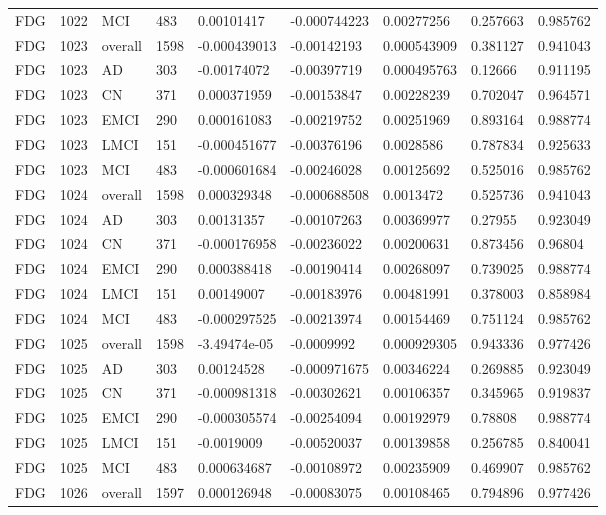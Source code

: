 \begin{landscape}
\begin{longtable}{lllllllll}
FDG & 1022 & MCI & 483 & 0.00101417 & -0.000744223 & 0.00277256 & 0.257663 & 0.985762 \\
FDG & 1023 & overall & 1598 & -0.000439013 & -0.00142193 & 0.000543909 & 0.381127 & 0.941043 \\
FDG & 1023 & AD & 303 & -0.00174072 & -0.00397719 & 0.000495763 & 0.12666 & 0.911195 \\
FDG & 1023 & CN & 371 & 0.000371959 & -0.00153847 & 0.00228239 & 0.702047 & 0.964571 \\
FDG & 1023 & EMCI & 290 & 0.000161083 & -0.00219752 & 0.00251969 & 0.893164 & 0.988774 \\
FDG & 1023 & LMCI & 151 & -0.000451677 & -0.00376196 & 0.0028586 & 0.787834 & 0.925633 \\
FDG & 1023 & MCI & 483 & -0.000601684 & -0.00246028 & 0.00125692 & 0.525016 & 0.985762 \\
FDG & 1024 & overall & 1598 & 0.000329348 & -0.000688508 & 0.0013472 & 0.525736 & 0.941043 \\
FDG & 1024 & AD & 303 & 0.00131357 & -0.00107263 & 0.00369977 & 0.27955 & 0.923049 \\
FDG & 1024 & CN & 371 & -0.000176958 & -0.00236022 & 0.00200631 & 0.873456 & 0.96804 \\
FDG & 1024 & EMCI & 290 & 0.000388418 & -0.00190414 & 0.00268097 & 0.739025 & 0.988774 \\
FDG & 1024 & LMCI & 151 & 0.00149007 & -0.00183976 & 0.00481991 & 0.378003 & 0.858984 \\
FDG & 1024 & MCI & 483 & -0.000297525 & -0.00213974 & 0.00154469 & 0.751124 & 0.985762 \\
FDG & 1025 & overall & 1598 & -3.49474e-05 & -0.0009992 & 0.000929305 & 0.943336 & 0.977426 \\
FDG & 1025 & AD & 303 & 0.00124528 & -0.000971675 & 0.00346224 & 0.269885 & 0.923049 \\
FDG & 1025 & CN & 371 & -0.000981318 & -0.00302621 & 0.00106357 & 0.345965 & 0.919837 \\
FDG & 1025 & EMCI & 290 & -0.000305574 & -0.00254094 & 0.00192979 & 0.78808 & 0.988774 \\
FDG & 1025 & LMCI & 151 & -0.0019009 & -0.00520037 & 0.00139858 & 0.256785 & 0.840041 \\
FDG & 1025 & MCI & 483 & 0.000634687 & -0.00108972 & 0.00235909 & 0.469907 & 0.985762 \\
FDG & 1026 & overall & 1597 & 0.000126948 & -0.00083075 & 0.00108465 & 0.794896 & 0.977426 \\

\end{longtable}
\end{landscape}
